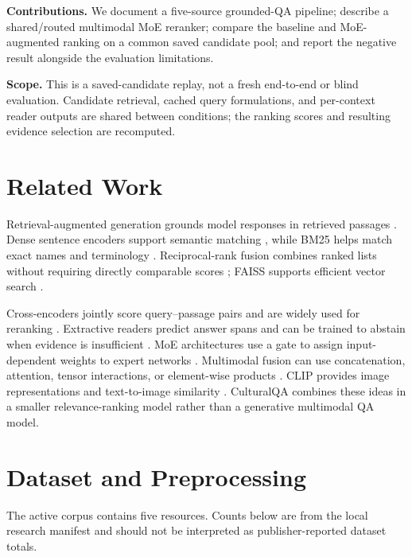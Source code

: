 \documentclass[10pt,a4paper]{article}
\begin{document}
\textbf{Contributions.} We document a five-source grounded-QA pipeline; describe a shared/routed multimodal MoE reranker; compare the baseline and MoE-augmented ranking on a common saved candidate pool; and report the negative result alongside the evaluation limitations.

\textbf{Scope.} This is a saved-candidate replay, not a fresh end-to-end or blind evaluation. Candidate retrieval, cached query formulations, and per-context reader outputs are shared between conditions; the ranking scores and resulting evidence selection are recomputed.

\section{Related Work}
Retrieval-augmented generation grounds model responses in retrieved passages \cite{rag}. Dense sentence encoders support semantic matching \cite{sbert}, while BM25 helps match exact names and terminology \cite{bm25}. Reciprocal-rank fusion combines ranked lists without requiring directly comparable scores \cite{rrf}; FAISS supports efficient vector search \cite{faiss}.

Cross-encoders jointly score query--passage pairs and are widely used for reranking \cite{monobert,msmarco}. Extractive readers predict answer spans and can be trained to abstain when evidence is insufficient \cite{roberta,squad1,squad2}. MoE architectures use a gate to assign input-dependent weights to expert networks \cite{shazeer,switch}. Multimodal fusion can use concatenation, attention, tensor interactions, or element-wise products \cite{tfn,lmf}. CLIP provides image representations and text-to-image similarity \cite{clip}. CulturalQA combines these ideas in a smaller relevance-ranking model rather than a generative multimodal QA model.

\section{Dataset and Preprocessing}
The active corpus contains five resources. Counts below are from the local research manifest and should not be interpreted as publisher-reported dataset totals.
\end{document}
